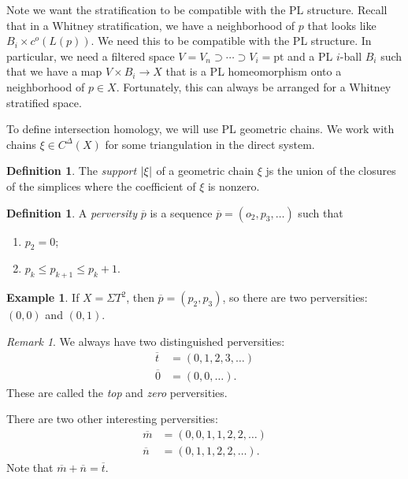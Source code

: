 \documentclass[leqno, openany]{memoir}
\theoremstyle{definition}
\newtheorem{defn}[thm]{Definition}
\newtheorem{exm}[thm]{Example}
\theoremstyle{remark}
\newtheorem{rmk}[thm]{Remark}
\theoremstyle{plain}
\theoremstyle{definition}
\theoremstyle{remark}
\newcommand{\mr}[1]{\mathrm{#1}}
\begin{document}
Note we want the stratification to be compatible with the PL structure. Recall that in a Whitney stratification, we have a neighborhood of $p$ that looks like $B_i \times c^o(L(p))$. We need this to be compatible with the PL structure. In particular, we need a filtered space $V = V_n \supset \cdots \supset V_i = \mr{pt}$ and a PL $i$-ball $B_i$ such that we have a map $V \times B_i \to X$ that is a PL homeomorphism onto a neighborhood of $p \in X$. Fortunately, this can always be arranged for a Whitney stratified space.

To define intersection homology, we will use PL geometric chains. We work with chains $\xi \in C^{\Delta}(X)$ for some triangulation in the direct system.

\begin{defn}
    The \textit{support} $\abs{\xi}$ of a geometric chain $\xi$ js the union of the closures of the simplices where the coefficient of $\xi$ is nonzero.
\end{defn}

\begin{defn}
    A \textit{perversity} $\overline{p}$ is a sequence $\overline{p} = (o_2, p_3, \ldots)$ such that
    \begin{enumerate}
        \item $p_2 = 0$;
        \item $p_k \leq p_{k+1} \leq p_{k} + 1$.
    \end{enumerate}
\end{defn}

\begin{exm}
    If $X = \Sigma T^2$, then $\overline{p} = (p_2, p_3)$, so there are two perversities: $(0,0)$ and $(0,1)$.
\end{exm}

\begin{rmk}
    We always have two distinguished perversities:
    \begin{align}
        \overline{t} &= (0, 1, 2, 3, \ldots) \\
        \overline{0} &= (0, 0, \ldots).
    \end{align}
    These are called the \textit{top} and \textit{zero} perversities.
\end{rmk}

There are two other interesting perversities:
\begin{align}
    \overline{m} &= (0,0,1,1,2,2,\ldots) \\
    \overline{n} &= (0,1,1,2,2,\ldots).
\end{align}
Note that $\overline{m} + \overline{n} = \overline{t}$.
\end{document}
